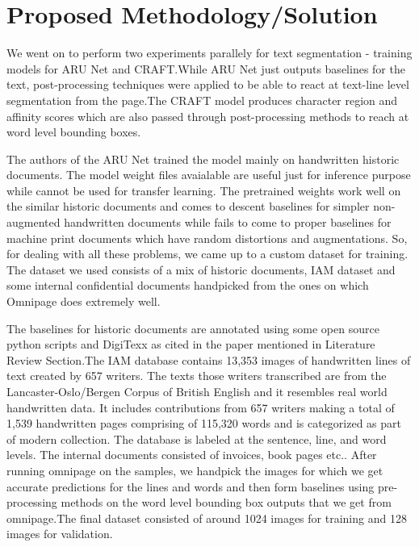 %


{\let\clearpage\relax \chapter{Proposed Methodology/Solution}}

We went on to perform two experiments parallely for text segmentation - training models for ARU Net and CRAFT.While ARU Net just outputs baselines for the text, post-processing techniques were applied to be able to react at text-line level segmentation from the page\cite{3}.The CRAFT model produces character region and affinity scores which are also passed through post-processing methods to reach at word level bounding boxes.\cite{5}

The authors of the ARU Net trained the model mainly on handwritten historic documents. The model weight files avaialable are useful just for inference purpose while cannot be used for transfer learning. The pretrained weights work well on the similar historic documents and comes to descent baselines for simpler non-augmented handwritten documents while fails to come to proper baselines for machine print documents which have random distortions and augmentations. So, for dealing with all these problems, we came up to a custom dataset for training. The dataset we used consists of a mix of historic documents, IAM dataset and some internal confidential documents handpicked from the ones on which Omnipage does extremely well.

The baselines for historic documents are annotated using some open source python scripts and DigiTexx as cited in the paper mentioned in Literature Review Section\cite{6}.The IAM database contains 13,353 images of handwritten lines of text created by 657 writers. The texts those writers transcribed are from the Lancaster-Oslo/Bergen Corpus of British English and it resembles real world handwritten data. It includes contributions from 657 writers making a total of 1,539 handwritten pages comprising of 115,320 words and is categorized as part of modern collection. The database is labeled at the sentence, line, and word levels. The internal documents consisted of invoices, book pages etc.. After running omnipage on the samples, we handpick the images for which we get accurate predictions for the lines and words and then form baselines using pre-processing methods on the word level bounding box outputs that we get from omnipage.The final dataset consisted of around 1024 images for training and 128 images for validation.


